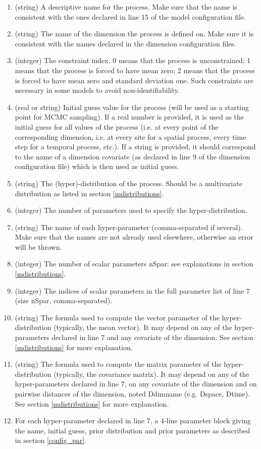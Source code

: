 \documentclass[a4paper]{article}
\begin{document}
	\begin{enumerate}
		\item (string) A descriptive name for the process. Make sure that the name is consistent with the ones declared in line 15 of the model configuration file.
		\item (string) The name of the dimension the process is defined on. Make sure it is consistent with the names declared in the dimension configuration files.
		\item (integer) The constraint index. 0 means that the process is unconstrained; 1 means that the process is forced to have mean zero; 2 means that the process is forced to have mean zero and standard deviation one. Such constraints are necessary in some models to avoid non-identifiability. 
		\item (real or string) Initial guess value for the process (will be used as a starting point for MCMC sampling). If a real number is provided, it is used as the initial guess for all values of the process (i.e. at every point of the corresponding dimension, i.e. at every site for a spatial process, every time step for a temporal process, etc.). If a string is provided, it should correspond to the name of a dimension covariate (as declared in line 9 of the dimension configuration file) which is then used as initial guess.
		\item (string) The (hyper)-distribution of the process. Should be a multivariate distribution as listed in section \ref{mdistributions}.
		\item (integer) The number of parameters used to specify the hyper-distribution.
		\item (string) The name of each hyper-parameter (comma-separated if several). Make sure that the names are not already used elsewhere, otherwise an error will be thrown.
		\item (integer) The number of scalar parameters nSpar: see explanations in section \ref{mdistributions}.
		\item (integer) The indices of scalar parameters in the full parameter list of line 7 (size nSpar, comma-separated).
		\item (string) The formula used to compute the vector parameter of the hyper-distribution (typically, the mean vector). It may depend on any of the hyper-parameters declared in line 7 and any covariate of the dimension. See section \ref{mdistributions} for more explanation.
		\item (string) The formula used to compute the matrix parameter of the hyper-distribution (typically, the covariance matrix). It may depend on any of the hyper-parameters declared in line 7, on any covariate of the dimension and on pairwise distances of the dimension, noted Ddimname (e.g. Dspace, Dtime). See section \ref{mdistributions} for more explanation.		
		\item For each hyper-parameter declared in line 7, a 4-line parameter block giving the name, initial guess, prior distribution and prior parameters as described in section \ref{config_par}.
	\end{enumerate}
	
\end{document}
